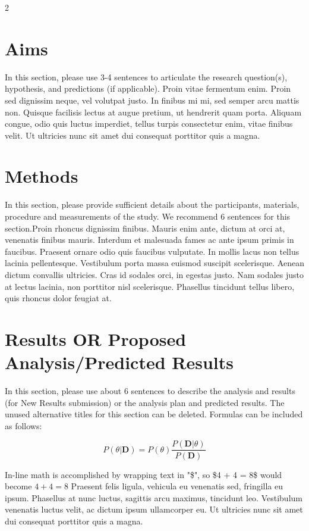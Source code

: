 \documentclass[10pt]{article}
\begin{document}
\begin{multicols}{2}
\section{Aims}
In this section, please use 3-4 sentences to articulate the research question(s), hypothesis, and predictions (if applicable). Proin vitae fermentum enim. Proin sed dignissim neque, vel volutpat justo. In finibus mi mi, sed semper arcu mattis non. Quisque facilisis lectus at augue pretium, ut hendrerit quam porta. Aliquam congue, odio quis luctus imperdiet, tellus turpis consectetur enim, vitae finibus velit. Ut ultricies nunc sit amet dui consequat porttitor quis a magna.

\section{Methods}
In this section, please provide sufficient details about the participants, materials, procedure and measurements of the study. We recommend 6 sentences for this section.Proin rhoncus dignissim finibus. Mauris enim ante, dictum at orci at, venenatis finibus mauris. Interdum et malesuada fames ac ante ipsum primis in faucibus. Praesent ornare odio quis faucibus vulputate. In mollis lacus non tellus lacinia pellentesque. Vestibulum porta massa euismod suscipit scelerisque. Aenean dictum convallis ultricies. Cras id sodales orci, in egestas justo. Nam sodales justo at lectus lacinia, non porttitor nisl scelerisque. Phasellus tincidunt tellus libero, quis rhoncus dolor feugiat at. 

\section{Results OR Proposed Analysis/Predicted Results}
In this section, please use about 6 sentences to describe the analysis and results (for New Results submission) or the analysis plan and predicted results. The unused alternative titles for this section can be deleted. Formulas can be included as follows:

\begin{equation}
        \label{eq:bayes}
        P(\theta|\textbf{D}) = P(\theta ) \frac{P(\textbf{D} |\theta)}{P(\textbf{D})}
\end{equation}

In-line math is accomplished by wrapping text in "\$", so \$4 + 4  = 8\$ would become $4+4 = 8$
Praesent felis ligula, vehicula eu venenatis sed, fringilla eu ipsum. Phasellus at nunc luctus, sagittis arcu maximus, tincidunt leo. Vestibulum venenatis luctus velit, ac dictum ipsum ullamcorper eu. Ut ultricies nunc sit amet dui consequat porttitor quis a magna.


\end{multicols}
\end{document}

